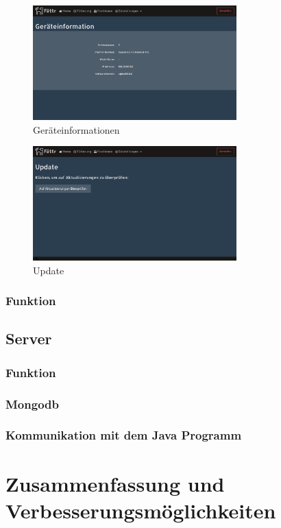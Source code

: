 \begin{figure}
\vspace{-30pt}
  \begin{center}
    \includegraphics[width=0.7\textwidth]{Bilder/Greistorfer/Gerateinformation.png}
  \end{center}
  \caption{Geräteinformationen}
  \label{Geräteinformationen}
  \vspace{-10pt}
\end{figure}

\begin{figure}
\vspace{-30pt}
  \begin{center}
    \includegraphics[width=0.7\textwidth]{Bilder/Greistorfer/Update.png}
  \end{center}
  \caption{Update}
  \label{Update}
  \vspace{-10pt}
\end{figure}

\subsubsection{Funktion}

\subsection{Server}

\subsubsection{Funktion}

\subsubsection{Mongodb}

\subsubsection{Kommunikation mit dem Java Programm}

\section{Zusammenfassung und Verbesserungsmöglichkeiten}